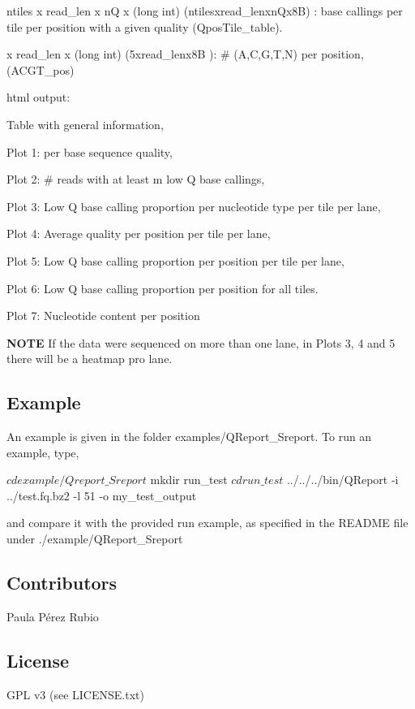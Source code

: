 \begin{DoxyItemize}
\begin{DoxyItemize}
\item {\ttfamily ntiles x read\+\_\+len x nQ x (long int)} ({\ttfamily ntiles}x{\ttfamily read\+\_\+len}x{\ttfamily nQ}x8B) \+: base callings per tile per position with a given quality ({\ttfamily Qpos\+Tile\+\_\+table}).
\item { x read\+\_\+len x (long int)} (5x{\ttfamily read\+\_\+len}x8B )\+: \# (A,C,G,T,N) per position, ({\ttfamily A\+C\+G\+T\+\_\+pos})
\end{DoxyItemize}
\item html output\+:
\begin{DoxyItemize}
\item Table with general information,
\item Plot 1\+: per base sequence quality,
\item Plot 2\+: \# reads with at least m low Q base callings,
\item Plot 3\+: Low Q base calling proportion per nucleotide type per tile per lane,
\item Plot 4\+: Average quality per position per tile per lane,
\item Plot 5\+: Low Q base calling proportion per position per tile per lane,
\item Plot 6\+: Low Q base calling proportion per position for all tiles.
\item Plot 7\+: Nucleotide content per position
\end{DoxyItemize}
\end{DoxyItemize}

{\bfseries N\+O\+TE} If the data were sequenced on more than one lane, in Plots 3, 4 and 5 there will be a heatmap pro lane.

\subsection*{Example}

An example is given in the folder {\ttfamily examples/\+Q\+Report\+\_\+\+Sreport}. To run an example, type,


\begin{DoxyCode}
$ cd example/Qreport\_Sreport
$ mkdir run\_test
$ cd run\_test
$ ../../../bin/QReport -i ../test.fq.bz2 -l 51 -o my\_test\_output
\end{DoxyCode}
 and compare it with the provided run example, as specified in the R\+E\+A\+D\+ME file under {\ttfamily ./example/\+Q\+Report\+\_\+\+Sreport}

\subsection*{Contributors}

Paula Pérez Rubio

\subsection*{License}

G\+PL v3 (see L\+I\+C\+E\+N\+S\+E.\+txt) 